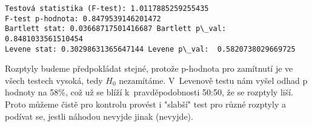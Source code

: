 \documentclass[11pt]{article}
\begin{document}
    \begin{Verbatim}[commandchars=\\\{\}]
Testová statistika (F-test): 1.0117885259255435
F-test p-hodnota: 0.8479539146201472
Bartlett stat: 0.03668717501416687 Bartlett p\_val:  0.8481033561510454
Levene stat: 0.30298631365647144 Levene p\_val:  0.5820738029669725

    \end{Verbatim}

\noindent
Rozptyly budeme předpokládat stejné, protože p-hodnota pro zamítnutí je
ve všech testech vysoká, tedy \(H_0\) nezamítáme. V~Levenově testu nám
vyšel odhad p hodnoty na 58\%, což už se blíží k~pravděpodobnosti 50:50,
že se rozptyly liší. Proto můžeme čistě pro kontrolu provést i "slabší"
test pro různé rozptyly a podívat se, jestli náhodou nevyjde jinak
(nevyjde).
\end{document}
